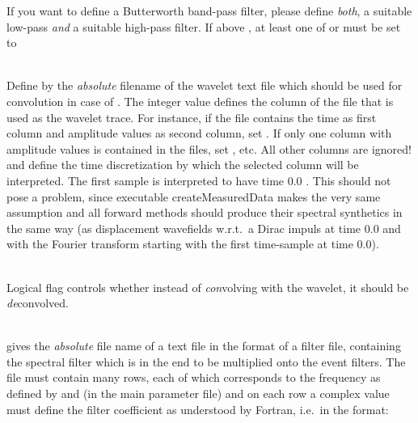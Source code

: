 If you want to define a Butterworth band-pass filter, please define \emph{both}, a suitable low-pass \emph{and} 
a suitable high-pass filter. If above  , at least 
one of  or  must be set to  

\textbf{}\\
Define by  the \emph{absolute} filename of the wavelet text file which should be 
used for convolution in case of  . 
The integer value  defines the column of the file that is used as the 
wavelet trace. For instance, if the file contains the time as first column and amplitude values as second column, set
 . If only one column with amplitude values is contained in the files, set 
, etc. All other columns are ignored!
 and  define the time discretization by which the selected column will be interpreted.
The first sample is interpreted to have time $0.0$ . This should not pose a problem, since executable
createMeasuredData makes the very same assumption and all forward methods should produce their 
spectral synthetics in the same way (as displacement wavefields w.r.t.\ a Dirac impuls at time 0.0
and with the Fourier transform starting with the first time-sample at time 0.0).

\textbf{}\\
Logical flag  controls whether instead of \emph{con}volving with the wavelet, 
it should be \emph{de}convolved.

\textbf{}\\
 gives the \emph{absolute} file name of a text file in the format of a filter file, 
containing the spectral filter which is in the end to be multiplied onto the event filters. 
The file must contain  many rows, 
each of which corresponds to the frequency as defined by  and 
 (in the \ASKI{} main parameter file) and on each row a complex 
value must define the filter coefficient as understood by Fortran, i.e.\ in the format:\\

